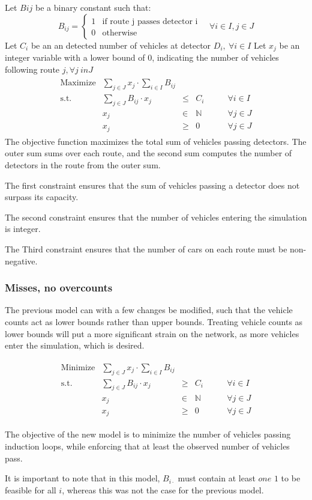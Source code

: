 Let $B{ij}$ be a binary constant such that:
\[
  B_{ij} = \begin{cases}
    1 & \text{if route j passes detector i}\\
    0 & \text{otherwise}
  \end{cases}\quad \forall i \in I, j \in J
\]
Let $C_i$ be an an detected number of vehicles at detector $D_i,\ \forall i \in I$
Let $x_j$ be an integer variable with a lower bound of 0, indicating the number of vehicles following route $j, \forall j \ in J$
\begin{align*}
  \begin{array}{rrcll}
    \text{Maximize} & \displaystyle\sum_{j\in J}x_j \cdot \sum_{i\in I}B_{ij}&&&\\
    \text{s.t.} & \displaystyle\sum_{j\in J}B_{ij}\cdot x_j & \leq & C_i & \qquad \forall i \in I\\
    & x_j & \in & \mathbb{N}&\qquad \forall j \in J\\
    & x_j & \geq & 0&\qquad \forall j \in J
  \end{array}
\end{align*}
The objective function maximizes the total sum of vehicles passing detectors. The outer sum sums over each route, and the second sum computes the number of detectors in the route from the outer sum.

The first constraint ensures that the sum of vehicles passing a detector does not surpass its capacity.

The second constraint ensures that the number of vehicles entering the simulation is integer.

The Third constraint ensures that the number of cars on each route must be non-negative.

\subsubsection{Misses, no overcounts}
The previous model can with a few changes be modified, such that the vehicle counts act as lower bounds rather than upper bounds.
Treating vehicle counts as lower bounds will put a more significant strain on the network, as more vehicles enter the simulation, which is desired.

\begin{align*}
  \begin{array}{rrcll}
    \text{Minimize} & \displaystyle\sum_{j\in J}x_j \cdot \sum_{i\in I}B_{ij}&&&\\
    \text{s.t.} & \displaystyle\sum_{j\in J}B_{ij}\cdot x_j & \geq & C_i & \qquad \forall i \in I\\
    & x_j & \in & \mathbb{N}&\qquad \forall j \in J\\
    & x_j & \geq & 0&\qquad \forall j \in J
  \end{array}
\end{align*}

The objective of the new model is to minimize the number of vehicles passing induction loops, while enforcing that at least the observed number of vehicles pass.

It is important to note that in this model, $B_{i\cdot}$ must contain at least $one$ $1$ to be feasible for all $i$, whereas this was not the case for the previous model.